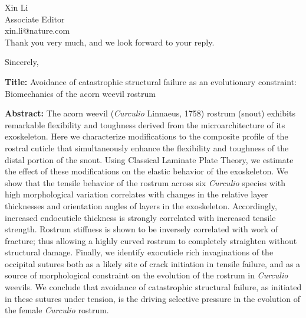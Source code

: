 \documentclass[10pt,letterpaper]{letter}
\begin{document}
\begin{letter}{Xin Li\\
Associate Editor\\
xin.li@nature.com\\
}
Thank you very much, and we look forward to your reply.

\closing{Sincerely,}

\newpage


\bigskip

\textbf{Title:}
Avoidance of catastrophic structural failure as an evolutionary constraint: Biomechanics of the acorn weevil rostrum

\textbf{Abstract:}
The acorn weevil (\textit{Curculio} Linnaeus, 1758) rostrum (snout) exhibits remarkable flexibility and toughness derived from the microarchitecture of its exoskeleton.
Here we characterize modifications to the composite profile of the rostral cuticle that simultaneously enhance the flexibility and toughness of the distal portion of the snout.
Using Classical Laminate Plate Theory, we estimate the effect of these modifications on the elastic behavior of the exoskeleton.
We show that the tensile behavior of the rostrum across six \textit{Curculio} species with high morphological variation correlates with changes in the relative layer thicknesses and orientation angles of layers in the exoskeleton.
Accordingly, increased endocuticle thickness is strongly correlated with increased tensile strength.
Rostrum stiffness is shown to be inversely correlated with work of fracture; thus allowing a highly curved rostrum to completely straighten without structural damage.
Finally, we identify exocuticle rich invaginations of the occipital sutures both as a likely site of crack initiation in tensile failure, and as a source of morphological constraint on the evolution of the rostrum in \textit{Curculio} weevils.
We conclude that avoidance of catastrophic structural failure, as initiated in these sutures under tension, is the driving selective pressure in the evolution of the female \textit{Curculio} rostrum.
\end{letter} 
\end{document}
